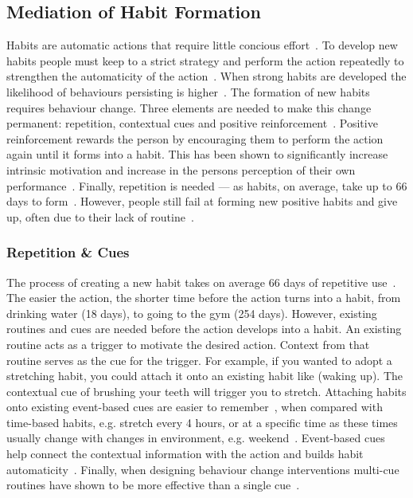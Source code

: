 \documentclass{scaffold/sigchi}
\begin{document}
\subsection{Mediation of Habit Formation}
Habits are automatic actions that require little concious effort~\cite{article_the_habitual_consumer}. To develop new habits people must keep to a strict strategy and perform the action repeatedly to strengthen the automaticity of the action~\cite{article_promoting_habit_formation}. When strong habits are developed the likelihood of behaviours persisting is higher~\cite{putting_habit_into_practice}. The formation of new habits requires behaviour change. Three elements are needed to make this change permanent: repetition, contextual cues and positive reinforcement~\cite{article_experiences_of_habit_formation}. Positive reinforcement rewards the person by encouraging them to perform the action again until it forms into a habit. This has been shown to significantly increase intrinsic motivation and increase in the persons perception of their own performance~\cite{positive_reinforcement_pro}. Finally, repetition is needed --- as habits, on average, take up to 66 days to form~\cite{article_how_habits_formed_modelling_habit_formation}.
However, people still fail at forming new positive habits and give up, often due to their lack of routine~\cite{article_promoting_habit_formation, article_the_habitual_consumer}.



\subsubsection{Repetition \& Cues}
The process of creating a new habit takes on average 66 days of repetitive use~\cite{article_how_habits_formed_modelling_habit_formation}. The easier the action, the shorter time before the action turns into a habit, from drinking water (18 days), to going to the gym (254 days). However, existing routines and cues are needed before the action develops into a habit. An existing routine acts as a trigger to motivate the desired action. Context from that routine serves as the cue for the trigger. For example, if you wanted to adopt a stretching habit, you could attach it onto an existing habit like (waking up). The contextual cue of brushing your teeth will trigger you to stretch. Attaching habits onto existing event-based cues are easier to remember~\cite{article_implementation_intentions_multicue}, when compared with time-based habits, e.g. stretch every 4 hours, or at a specific time as these times usually change with changes in environment, e.g. weekend~\cite{coaching_not_that_good}. Event-based cues help connect the contextual information with the action and builds habit automaticity~\cite{article_implementation_intentions}. Finally, when designing behaviour change interventions multi-cue routines have shown to be more effective than a single cue~\cite{article_understanding_use_contextual_cues_design_impl}.
\end{document}
